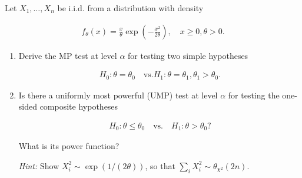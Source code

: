 
\begin{exercise}

Let $X_1,\dots,X_n$ be i.i.d. from a distribution with density

\begin{align*}
  f_\theta(x) = \frac{x}{\theta}\exp\left(-\frac{x^2}{2\theta}\right), \quad x \geq 0, \theta > 0.
\end{align*}

\begin{enumerate}[label = (\alph*)]
  \item Derive the MP test at level $\alpha$ for testing two simple hypotheses
  
  \begin{align*}
    H_0: \theta = \theta_0 \quad \text{vs.} H_1: \theta = \theta_1, \theta_1 > \theta_0.
  \end{align*}

  \item Is there a uniformly most powerful (UMP) test at level $\alpha$ for testing the
  one-sided composite hypotheses

  \begin{align*}
    H_0: \theta \leq \theta_0 \quad \text{vs.} \quad H_1: \theta > \theta_0?
  \end{align*}

  What is its power function?

  \textit{Hint:} Show $X_i^2 \sim \exp(1/(2\theta))$, so that $\sum_i X_i^2 \sim \theta_{\chi^2}(2n)$.
\end{enumerate}

\end{exercise}


\begin{solution}

\phantom{}

\end{solution}

